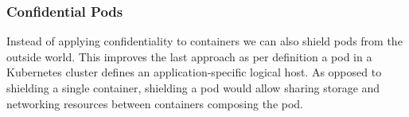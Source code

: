 \subsubsection{Confidential Pods}
\label{sec:confidential-applications}

Instead of applying confidentiality to containers we can also shield pods from
the outside world. This improves the last approach as per definition a pod in a
Kubernetes cluster defines an application-specific logical host. As opposed to
shielding a single container, shielding a pod would allow sharing storage and
networking resources between containers composing the pod.
